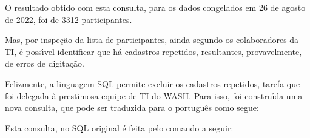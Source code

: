 \documentclass[
12pt,		%
openright,	%
twoside,  %
a4paper,			%
chapter=TITLE,		%
english,			%
french,				%
spanish,			%
brazil				%
]{USPSC-classe/USPSC_RedarTex}
\begin{document}
\noindent\begin{center}\mbox{\centering{}}\end{center}













O resultado obtido com esta consulta, para os dados congelados em 26 de agosto de 2022, foi de 3312 participantes.










Mas, por inspe\c{c}\~ao da lista de participantes, ainda segundo os colaboradores da TI, \'e poss\'{\i}vel identificar que h\'a cadastros repetidos, resultantes, provavelmente, de erros de digita\c{c}\~ao.










Felizmente, a linguagem SQL permite excluir os cadastros repetidos, tarefa que foi delegada \`a prestimosa equipe de TI do WASH. Para isso, foi constru\'{\i}da uma nova consulta, que pode ser traduzida para o portugu\^es como segue:











\noindent\begin{center}\mbox{\centering{}}\end{center}













Esta consulta, no SQL original \'e feita pelo comando a seguir:
\end{document}
